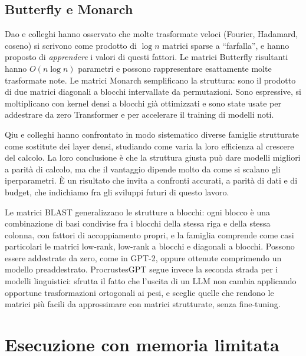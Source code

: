 \subsection{Butterfly e Monarch}

Dao e colleghi \cite{dao2019learning} hanno osservato che molte trasformate veloci (Fourier, Hadamard, coseno) si scrivono come prodotto di $\log n$ matrici sparse a ``farfalla'', e hanno proposto di \emph{apprendere} i valori di questi fattori. Le matrici Butterfly risultanti hanno $O(n\log n)$ parametri e possono rappresentare esattamente molte trasformate note. Le matrici Monarch \cite{dao2022monarch} semplificano la struttura: sono il prodotto di due matrici diagonali a blocchi intervallate da permutazioni. Sono espressive, si moltiplicano con kernel densi a blocchi già ottimizzati e sono state usate per addestrare da zero Transformer e per accelerare il training di modelli noti.

Qiu e colleghi \cite{qiu2024compute} hanno confrontato in modo sistematico diverse famiglie strutturate come sostitute dei layer densi, studiando come varia la loro efficienza al crescere del calcolo. La loro conclusione è che la struttura giusta può dare modelli migliori a parità di calcolo, ma che il vantaggio dipende molto da come si scalano gli iperparametri. È un risultato che invita a confronti accurati, a parità di dati e di budget, che indichiamo fra gli sviluppi futuri di questo lavoro.

Le matrici BLAST \cite{lee2024blast} generalizzano le strutture a blocchi: ogni blocco è una combinazione di basi condivise fra i blocchi della stessa riga e della stessa colonna, con fattori di accoppiamento propri, e la famiglia comprende come casi particolari le matrici low-rank, low-rank a blocchi e diagonali a blocchi. Possono essere addestrate da zero, come in GPT-2, oppure ottenute comprimendo un modello preaddestrato. ProcrustesGPT \cite{grishina2025procrustesgpt} segue invece la seconda strada per i modelli linguistici: sfrutta il fatto che l'uscita di un LLM non cambia applicando opportune trasformazioni ortogonali ai pesi, e sceglie quelle che rendono le matrici più facili da approssimare con matrici strutturate, senza fine-tuning.

\section{Esecuzione con memoria limitata}

